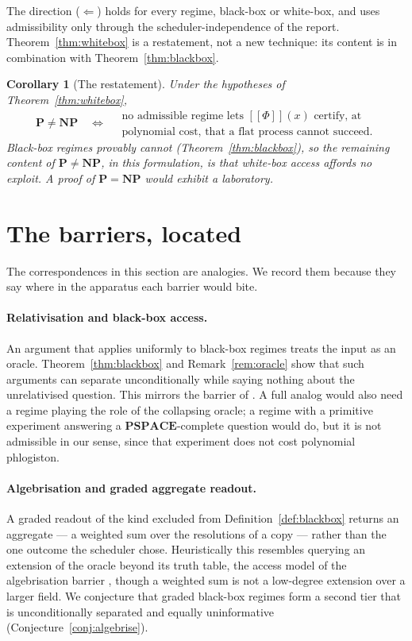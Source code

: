 \documentclass[11pt]{article}
\theoremstyle{definition}
\theoremstyle{plain}
\newtheorem{corollary}[definition]{Corollary}
\theoremstyle{remark}
\newcommand{\enc}[1]{[\![#1]\!]}
\newcommand{\Pclass}{\mathbf{P}}
\newcommand{\NPclass}{\mathbf{NP}}
\begin{document}
The direction ($\Leftarrow$) holds for every regime, black-box or
white-box, and uses admissibility only through the scheduler-independence
of the report. Theorem~\ref{thm:whitebox} is a restatement, not a new
technique: its content is in combination with Theorem~\ref{thm:blackbox}.

\begin{corollary}[The restatement]\label{cor:restatement}
Under the hypotheses of Theorem~\ref{thm:whitebox},
\[
\Pclass \neq \NPclass
\quad\Longleftrightarrow\quad
\begin{array}{l}
\text{no admissible regime lets } \enc{\Phi}(x) \text{ certify, at}\\
\text{polynomial cost, that a flat process cannot succeed.}
\end{array}
\]
Black-box regimes provably cannot (Theorem~\ref{thm:blackbox}), so the
remaining content of $\Pclass \neq \NPclass$, in this formulation, is that
white-box access affords no exploit. A proof of $\Pclass = \NPclass$ would
exhibit a laboratory.
\end{corollary}

\section{The barriers, located}\label{sec:barriers}

The correspondences in this section are analogies. We record them because
they say where in the apparatus each barrier would bite.

\paragraph{Relativisation and black-box access.} An argument that applies
uniformly to black-box regimes treats the input as an oracle.
Theorem~\ref{thm:blackbox} and Remark~\ref{rem:oracle} show that such
arguments can separate unconditionally while saying nothing about the
unrelativised question. This mirrors the barrier of \cite{BGS75}. A full
analog would also need a regime playing the role of the collapsing
oracle; a regime with a primitive experiment answering a
$\mathbf{PSPACE}$-complete question would do, but it is not admissible in
our sense, since that experiment does not cost polynomial phlogiston.

\paragraph{Algebrisation and graded aggregate readout.} A graded readout
of the kind excluded from Definition~\ref{def:blackbox} returns an
aggregate --- a weighted sum over the resolutions of a copy --- rather
than the one outcome the scheduler chose. Heuristically this resembles
querying an extension of the oracle beyond its truth table, the access
model of the algebrisation barrier \cite{AaronsonWigderson09}, though a
weighted sum is not a low-degree extension over a larger field. We
conjecture that graded black-box regimes form a second tier that is
unconditionally separated and equally uninformative
(Conjecture~\ref{conj:algebrise}).
\end{document}
